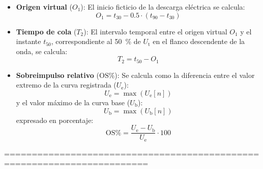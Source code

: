 \begin{enumerate}[resume]
\begin{itemize}
        \begin{equation}
            \label{eq:tiempo_frente}
            T_1 = \frac{t_{90} - t_{30}}{\num{0.6}}
        \end{equation}
        \item \textbf{Origen virtual} ($O_1$): El inicio ficticio de la descarga eléctrica se calcula:
        \begin{equation}
            \label{eq:origen_virtual}
            O_1 = t_{30} - \num{0.5} \cdot (t_{90} - t_{30})
        \end{equation}
        \item \textbf{Tiempo de cola} ($T_2$): El intervalo temporal entre el origen virtual $O_1$ y el instante $t_{50}$, correspondiente al \qty{50}{\percent} de $U_\text{t}$ en el flanco descendente de la onda, se calcula:
        \begin{equation}
            \label{eq:tiempo_cola}
            T_2 = t_{50} - O_1
        \end{equation}
        \item \textbf{Sobreimpulso relativo} ($\text{OS}\%$): Se calcula como la diferencia entre el valor extremo de la curva registrada ($U_\text{e}$):
        \begin{equation}
            \label{eq:max_curva_registrada}
            U_\text{e} = \max(U_\text{e}[n])
        \end{equation}
        y el valor máximo de la curva base ($U_\text{b}$):
        \begin{equation}
            \label{eq:max_curva_base}
            U_\text{b} = \max(U_\text{b}[n])
        \end{equation}
        expresado en porcentaje:
        \begin{equation}
            \label{eq:sobreimpulso_relativo}
            \text{OS}\% = \frac{U_\text{e} - U_\text{b}}{U_\text{e}} \cdot \num{100}
        \end{equation}
    \end{itemize}
\end{enumerate}



\noindent
========================================================================

